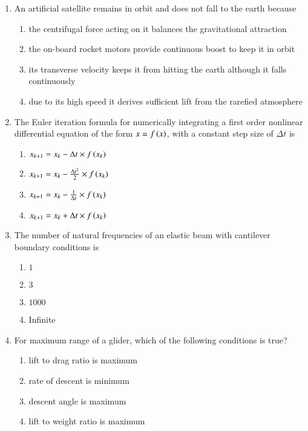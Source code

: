 \documentclass[journal,12pt,twocolumn]{IEEEtran}
\theoremstyle{remark}
\begin{document}
\begin{enumerate}
\item An artificial satellite remains in orbit and does not fall to the earth because
\begin{enumerate}
\item the centrifugal force acting on it balances the gravitational attraction 
\item the on-board rocket motors provide continuous boost to keep it in orbit
\item its transverse velocity keeps it from hitting the earth although it falls continuously 
\item due to its high speed it derives sufficient lift from the rarefied atmosphere
\end{enumerate}


\item The Euler iteration formula for numerically integrating a first order nonlinear differential equation of the form $x=f\left(x\right)$, with a constant step size of $\Delta t$ is
\begin{enumerate}
\item $x_{k+1}=x_{k}-\Delta t\times f\left(x_{k}\right)$
\item $x_{k+1}=x_{k}-\frac{\Delta t^{2}}{2}\times f\left(x_{k}\right)$
\item $x_{k+1}=x_{k}-\frac{1}{\Delta t}\times f\left(x_{k}\right)$
\item $x_{k+1}=x_{k}+\Delta t\times f\left(x_{k}\right)$
\end{enumerate}


\item The number of natural frequencies of an elastic beam with cantilever boundary conditions is
\begin{multicols}{2}
\begin{enumerate}
\item $1$
\item $3$
\item $1000$
\item Infinite
\end{enumerate}
\end{multicols}


\item For maximum range of a glider, which of the following conditions is true?
\begin{enumerate}
\item lift to drag ratio is maximum
\item rate of descent is minimum
\item descent angle is maximum
\item lift to weight ratio is maximum
\end{enumerate}


\end{enumerate}
\end{document}
